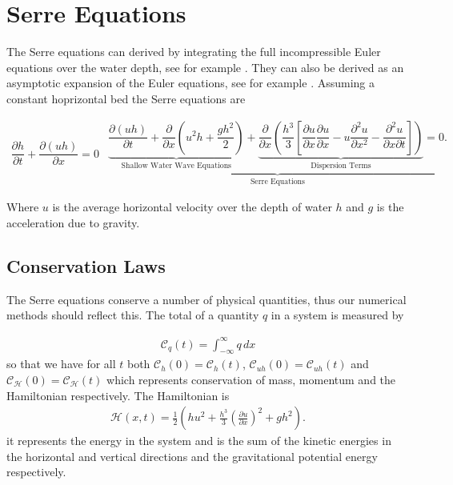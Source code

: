 \documentclass[SingleSpace,12pt,Proceedings]{Serre_ASCE}
\begin{document}
\section{Serre Equations}
\label{section:Serre Equations}
The Serre equations can derived by integrating the full incompressible Euler equations over the water depth, see for example . They can also be derived as an asymptotic expansion of the Euler equations, see for example . Assuming a constant hoprizontal bed the Serre equations are \cite{Guyenne-etal-2014-169}
\begin{linenomath*}
\begin{subequations}\label{eq:Serre_nonconservative_form}
\begin{gather}
\dfrac{\partial h}{\partial t} + \dfrac{\partial (uh)}{\partial x} = 0
\label{eq:Serre_continuity}
\end{gather}
\begin{gather}
\underbrace{\underbrace{\dfrac{\partial (uh)}{\partial t} + \dfrac{\partial}{\partial x} \left ( u^2h + \dfrac{gh^2}{2}\right )}_{\text{Shallow Water Wave Equations}} + \underbrace{\dfrac{\partial}{\partial x} \left (  \dfrac{h^3}{3} \left [ \dfrac{\partial u }{\partial x} \dfrac{\partial u}{\partial x} - u\dfrac{\partial^2 u}{\partial x^2}  - \dfrac{\partial^2 u}{\partial x \partial t}\right ] \right )}_{\text{Dispersion Terms}} = 0.}_{\text{Serre Equations}}
\label{eq:Serre_momentum}
\end{gather}
\end{subequations}
\end{linenomath*}
Where $u$ is the average horizontal velocity over the depth of water $h$ and $g$ is the acceleration due to gravity. 

\subsection{Conservation Laws}
The Serre equations conserve a number of physical quantities, thus our numerical methods should reflect this. The total of a quantity $q$ in a system is measured by

\begin{gather}
\label{eqn:Condef}
\mathcal{C}_q(t) = \int_{-\infty}^{\infty} q\, dx
\end{gather}
so that we have for all $t$ both $\mathcal{C}_{h}(0) = \mathcal{C}_{h}(t)$, $\mathcal{C}_{uh}(0) = \mathcal{C}_{uh}(t)$ and $\mathcal{C}_{\mathcal{H}}(0) = \mathcal{C}_{\mathcal{H}}(t)$  which represents conservation of mass, momentum and the Hamiltonian \cite{Li-Y-2002,Hank-etal-2010-2034,Green-Naghdi-1976-237} respectively. The Hamiltonian is
\begin{gather}
\label{eqn:Hamildef}
\mathcal{H}(x,t) = \frac{1}{2} \left(hu^2 + \frac{h^3}{3} \left(\frac{\partial u}{\partial x}\right)^2 + gh^2\right).
\end{gather}
it represents the energy in the system and is the sum of the kinetic energies in the horizontal and vertical directions and the gravitational potential energy respectively.   
\end{document}
